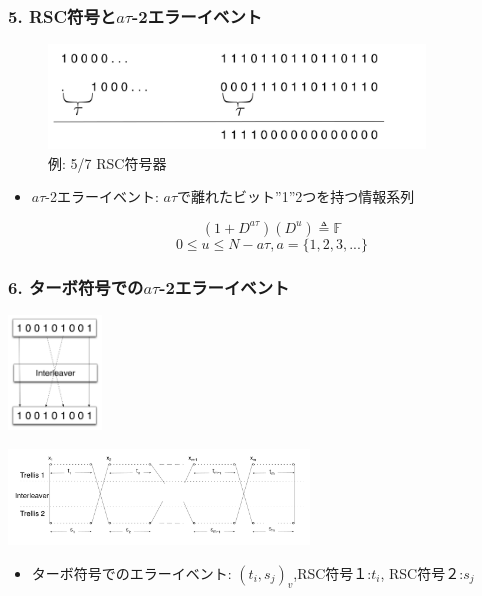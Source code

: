 \documentclass{beamer}  %
\begin{document}
\begin{frame}
\frametitle{5. RSC符号と$a\tau$-2エラーイベント}
\begin{figure}
		\includegraphics[width=10cm]{RSCExample.pdf}
		\caption{例: 5/7 RSC符号器}
	\end{figure}
\begin{itemize}
\setlength\itemsep{2em}

\item $a\tau$-2エラーイベント: $a\tau$で離れたビット''1''2つを持つ情報系列


$$(1+D^{a\tau})(D^u) \triangleq \mathbb{F}$$
$$0\leq u\leq N-a\tau, a=\{1,2,3,...\}$$


\end{itemize}

\end{frame}

\begin{frame}
\frametitle{6.  ターボ符号での$a\tau$-2エラーイベント}

\begin{center}
\includegraphics[width=2.5cm]{InterleaverWorking.pdf}
\end{center}

\begin{center}
\includegraphics[width=8cm]{weight2m.pdf}
\end{center}

\begin{itemize}
\item  ターボ符号でのエラーイベント: $(t_i,s_j)_v$,RSC符号１:$t_i$, RSC符号２:$s_j$
\end{itemize}


\end{frame}
\end{document}
